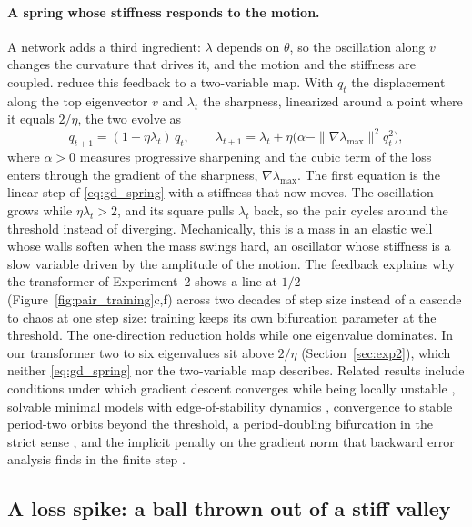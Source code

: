 \paragraph{A spring whose stiffness responds to the motion.} A network adds a third ingredient: $\lambda$ depends on $\theta$, so the oscillation along $v$ changes the curvature that drives it, and the motion and the stiffness are coupled. \citet{damian2022selfstabilization} reduce this feedback to a two-variable map. With $q_t$ the displacement along the top eigenvector $v$ and $\lambda_t$ the sharpness, linearized around a point where it equals $2/\eta$, the two evolve as
\begin{equation}
q_{t+1}=(1-\eta\lambda_t)\,q_t,\qquad \lambda_{t+1}=\lambda_t+\eta\big(\alpha-\|\nabla\lambda_{\max}\|^2 q_t^2\big),
\label{eq:selfstab}
\end{equation}
where $\alpha>0$ measures progressive sharpening and the cubic term of the loss enters through the gradient of the sharpness, $\nabla\lambda_{\max}$. The first equation is the linear step of \eqref{eq:gd_spring} with a stiffness that now moves. The oscillation grows while $\eta\lambda_t>2$, and its square pulls $\lambda_t$ back, so the pair cycles around the threshold instead of diverging. Mechanically, this is a mass in an elastic well whose walls soften when the mass swings hard, an oscillator whose stiffness is a slow variable driven by the amplitude of the motion. The feedback explains why the transformer of Experiment~2 shows a line at $1/2$ (Figure~\ref{fig:pair_training}c,f) across two decades of step size instead of a cascade to chaos at one step size: training keeps its own bifurcation parameter at the threshold. The one-direction reduction holds while one eigenvalue dominates. In our transformer two to six eigenvalues sit above $2/\eta$ (Section~\ref{sec:exp2}), which neither \eqref{eq:gd_spring} nor the two-variable map describes. Related results include conditions under which gradient descent converges while being locally unstable \citep{arora2022gradient,ahn2022unstable}, solvable minimal models with edge-of-stability dynamics \citep{zhu2022edgeofstability}, convergence to stable period-two orbits beyond the threshold, a period-doubling bifurcation in the strict sense \citep{chen2022edge}, and the implicit penalty on the gradient norm that backward error analysis finds in the finite step \citep{barrett2020implicit}.

\subsection{A loss spike: a ball thrown out of a stiff valley}
\label{sec:catapult}

